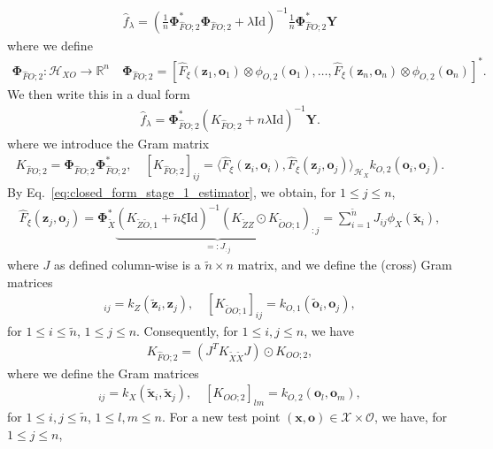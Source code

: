 \documentclass[11pt]{article}
\newcommand{\bx}{\mathbf x}
\newcommand{\bz}{\mathbf z}
\newcommand{\bo}{\mathbf o}
\newcommand{\calH}{\mathcal{H}}
\newcommand{\calO}{\mathcal{O}}
\newcommand{\calX}{\mathcal{X}}
\newcommand{\0}{\mathbf{0}}
\newcommand{\bPhi}{\boldsymbol{\Phi}}
\begin{document}
\begin{appendix}
\begin{align*}
    \hat{f}_{\lambda} = \left(\frac{1}{n}\bPhi_{\hat{F}O;2}^{\ast}\bPhi_{\hat{F}O;2} + \lambda\mathrm{Id}\right)^{-1}\frac{1}{n}\bPhi_{\hat{F}O;2}^{\ast}\mathbf{Y}
\end{align*}
where we define 
\begin{align*}
    \bPhi_{\hat{F}O;2} : \calH_{XO}\to \mathbb{R}^n \quad \bPhi_{\hat{F}O;2}  = \left[\hat{F}_{\xi}(\bz_1,\bo_1)\otimes \phi_{O,2}(\bo_1),\dots, \hat{F}_{\xi}(\bz_n,\bo_n)\otimes \phi_{O,2}(\bo_n)\right]^{\ast}.
\end{align*}
We then write this in a dual form
\begin{align*}
    \hat{f}_{\lambda} = \bPhi_{\hat{F}O;2}^{\ast}\left(K_{\hat{F}O;2} + n\lambda\mathrm{Id}\right)^{-1}\mathbf{Y}.
\end{align*}
where we introduce the Gram matrix
\begin{align*}
    K_{\hat{F}O;2} = \bPhi_{\hat{F}O;2}\bPhi_{\hat{F}O;2}^{\ast}, \quad [K_{\hat{F}O;2}]_{ij} = \langle \hat{F}_{\xi}(\bz_i,\bo_i), \hat{F}_{\xi}(\bz_j, \bo_j)\rangle_{\calH_{X}}k_{O,2}(\bo_i, \bo_j).
\end{align*}
By Eq.~\eqref{eq:closed_form_stage_1_estimator}, we obtain, for $1\leq j\leq n$,  
\begin{align}
\label{eq:closed_form_hat_F_xi}
    \hat{F}_{\xi}(\bz_j, \bo_j) = \bPhi_{\tilde{X}}^{\ast}\underbrace{\left(K_{\tilde{Z}\tilde{O},1} + \tilde{n}\xi\mathrm{Id}\right)^{-1}\left(K_{\tilde{Z}Z}\odot K_{\tilde{O}O;1}\right)_{: j}}_{=: J_{:j}} = \sum_{i=1}^{\tilde{n}}J_{ij}\phi_{X}(\tilde{\bx}_i),
\end{align}
where $J$ as defined column-wise is a $\tilde{n}\times n$ matrix, and we define the (cross) Gram matrices
\begin{align*}
    [K_{\tilde{Z}Z}]_{ij} = k_{Z}(\tilde{\bz}_i, \bz_j),\quad [K_{\tilde{O}O;1}]_{ij} = k_{O,1}(\tilde{\bo}_i, \bo_j),
\end{align*}
for $1\leq i\leq \tilde{n}$, $1\leq j\leq n$. Consequently, for $1\leq i,j\leq n$,  we have
\begin{align*}
    K_{\hat{F}O;2} = \left(J^{T}K_{\tilde{X}\tilde{X}}J\right)\odot K_{OO;2},
\end{align*}
where we define the Gram matrices
\begin{align*}
    [K_{\tilde{X}\tilde{X}}]_{ij} = k_{X}(\tilde{\bx}_{i}, \tilde{\bx}_{j}), \quad [K_{OO;2}]_{lm} = k_{O,2}(\bo_l, \bo_m),
\end{align*}
for $1\leq i,j\leq \tilde{n}$, $1\leq l, m\leq n$. For a new test point $(\bx,\bo)\in \calX\times \calO$, we have, for $1\leq j\leq n$, 

\end{appendix}
\end{document}
